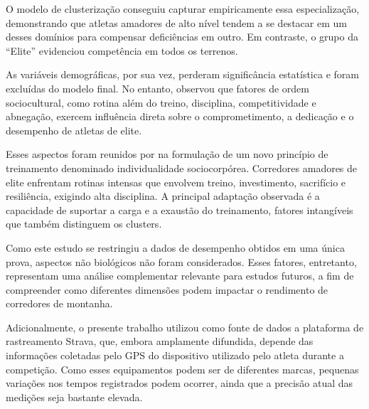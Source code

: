 O modelo de clusterização conseguiu capturar empiricamente essa especialização, demonstrando que atletas amadores de alto nível tendem a se destacar em um desses domínios para compensar deficiências em outro. Em contraste, o grupo da “Elite” evidenciou competência em todos os terrenos.

As variáveis demográficas, por sua vez, perderam significância estatística e foram excluídas do modelo final. No entanto, \cite{Silva2022} observou que fatores de ordem sociocultural, como rotina além do treino, disciplina, competitividade e abnegação, exercem influência direta sobre o comprometimento, a dedicação e o desempenho de atletas de elite.

Esses aspectos foram reunidos por \cite{Silva2022} na formulação de um novo princípio de treinamento denominado individualidade sociocorpórea. Corredores amadores de elite enfrentam rotinas intensas que envolvem treino, investimento, sacrifício e resiliência, exigindo alta disciplina. A principal adaptação observada é a capacidade de suportar a carga e a exaustão do treinamento, fatores intangíveis que também distinguem os clusters.

Como este estudo se restringiu a dados de desempenho obtidos em uma única prova, aspectos não biológicos não foram considerados. Esses fatores, entretanto, representam uma análise complementar relevante para estudos futuros, a fim de compreender como diferentes dimensões podem impactar o rendimento de corredores de montanha.

Adicionalmente, o presente trabalho utilizou como fonte de dados a plataforma de rastreamento Strava, que, embora amplamente difundida, depende das informações coletadas pelo GPS do dispositivo utilizado pelo atleta durante a competição. Como esses equipamentos podem ser de diferentes marcas, pequenas variações nos tempos registrados podem ocorrer, ainda que a precisão atual das medições seja bastante elevada.